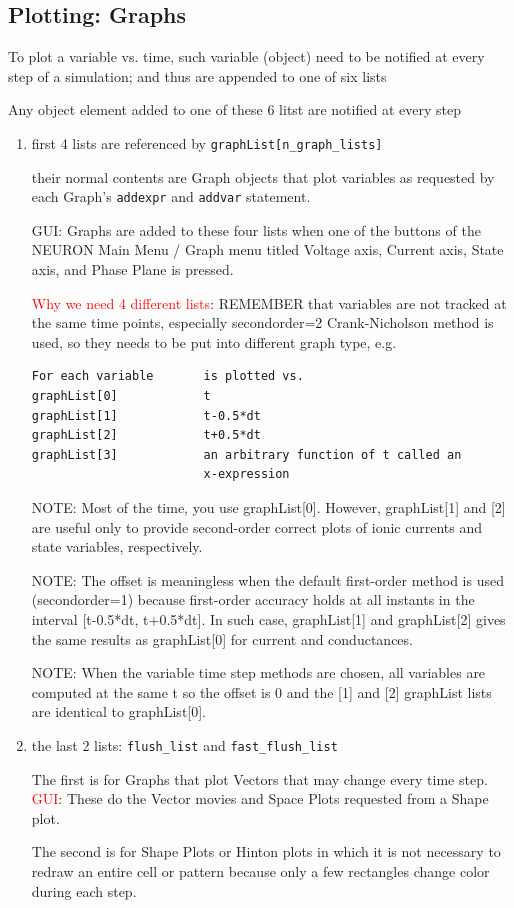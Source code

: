 \subsection{Plotting: Graphs}
\label{sec:NEURON-plotting}

To plot a variable vs. time, such variable (object) need to be notified at every
step of a simulation; and thus are appended to one of six lists

Any object element added to one of these 6 litst are notified at every step
\begin{enumerate}
  \item first 4 lists are referenced by \verb!graphList[n_graph_lists]!
  
  their normal contents are Graph objects that plot variables as requested
  by each Graph's \verb!addexpr! and \verb!addvar! statement.
  
GUI: Graphs are added to these four lists when
one of the buttons of the NEURON Main Menu / Graph menu titled Voltage axis,
Current axis, State axis, and Phase Plane is pressed.

\textcolor{red}{Why we need 4 different lists}: REMEMBER that variables are not
tracked at the same time points, especially secondorder=2 Crank-Nicholson
method is used, so they needs to be put into different graph type, e.g.
\begin{verbatim}
For each variable       is plotted vs.
graphList[0]            t
graphList[1]            t-0.5*dt
graphList[2]            t+0.5*dt
graphList[3]            an arbitrary function of t called an
                        x-expression
\end{verbatim}

NOTE: Most of the time, you use graphList[0]. However, graphList[1] and [2] are
useful only to provide second-order correct plots of ionic currents and state
variables, respectively.

NOTE: The offset is meaningless when the default first-order
method is used (secondorder=1) because first-order accuracy holds at all
instants in the interval [t-0.5*dt, t+0.5*dt].
In such case, graphList[1] and graphList[2] gives the same results as
graphList[0] for current and conductances.

NOTE: When the variable time step methods are chosen, all variables are computed
at the same t so the offset is 0 and the [1] and [2] graphList lists are identical to graphList[0]. 

  \item the last 2 lists: \verb!flush_list! and \verb!fast_flush_list!

The first is for Graphs that plot Vectors that may change every time step.
\textcolor{red}{GUI}: These do the Vector
movies and Space Plots requested from a Shape plot.

The second is for Shape Plots or Hinton plots in which it is not necessary to
redraw an entire cell or pattern because only a few rectangles change color
during each step.


\end{enumerate}

